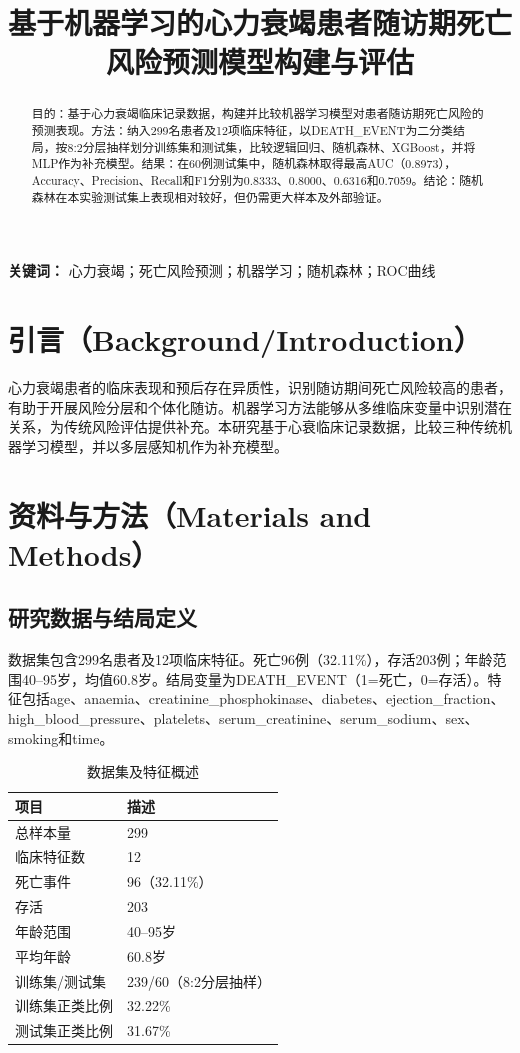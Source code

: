 \documentclass[UTF8,a4paper,12pt]{ctexart}
\title{基于机器学习的心力衰竭患者随访期死亡风险预测模型构建与评估}
\author{}
\date{}
\begin{document}
\maketitle

\begin{abstract}
目的：基于心力衰竭临床记录数据，构建并比较机器学习模型对患者随访期死亡风险的预测表现。方法：纳入299名患者及12项临床特征，以DEATH\_EVENT为二分类结局，按8:2分层抽样划分训练集和测试集，比较逻辑回归、随机森林、XGBoost，并将MLP作为补充模型。结果：在60例测试集中，随机森林取得最高AUC（0.8973），Accuracy、Precision、Recall和F1分别为0.8333、0.8000、0.6316和0.7059。结论：随机森林在本实验测试集上表现相对较好，但仍需更大样本及外部验证。
\end{abstract}
\noindent\textbf{关键词：} 心力衰竭；死亡风险预测；机器学习；随机森林；ROC曲线

\section{引言（Background/Introduction）}
心力衰竭患者的临床表现和预后存在异质性，识别随访期间死亡风险较高的患者，有助于开展风险分层和个体化随访。机器学习方法能够从多维临床变量中识别潜在关系，为传统风险评估提供补充。本研究基于心衰临床记录数据，比较三种传统机器学习模型，并以多层感知机作为补充模型。

\section{资料与方法（Materials and Methods）}
\subsection{研究数据与结局定义}
数据集包含299名患者及12项临床特征。死亡96例（32.11\%），存活203例；年龄范围40--95岁，均值60.8岁。结局变量为DEATH\_EVENT（1=死亡，0=存活）。特征包括age、anaemia、creatinine\_phosphokinase、diabetes、ejection\_fraction、high\_blood\_pressure、platelets、serum\_creatinine、serum\_sodium、sex、smoking和time。

\begin{table}[H]\centering
\caption{数据集及特征概述}
\begin{tabular}{ll}\toprule
项目&描述\\\midrule
总样本量&299\\
临床特征数&12\\
死亡事件&96（32.11\%）\\
存活&203\\
年龄范围&40--95岁\\
平均年龄&60.8岁\\
训练集/测试集&239/60（8:2分层抽样）\\
训练集正类比例&32.22\%\\
测试集正类比例&31.67\%\\\bottomrule
\end{tabular}\end{table}
\end{document}
